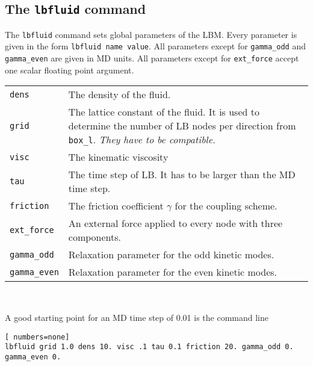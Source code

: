 \subsection*{The \lstinline|lbfluid| command}
The \lstinline{lbfluid} command sets global parameters of the LBM. Every
parameter is given in the form \lstinline|lbfluid name value|. 
All parameters except for \lstinline|gamma_odd| and  \lstinline|gamma_even|
are given in MD units. All parameters except for \lstinline|ext_force| accept
one scalar floating point argument. \\
\vspace{0,2cm}
\begin{tabular}{p{}p{}}
\lstinline|dens| & The density of the fluid.\\
\lstinline|grid| & The lattice constant of the fluid. It is used to determine the number of LB nodes 
per direction from \lstinline|box_l|. {\em They have to be compatible.} \\
\lstinline|visc| & The kinematic viscosity \\
\lstinline|tau| & The time step of LB. It has to be larger than the MD time step. \\
\lstinline|friction| & The friction coefficient $\gamma$ for the coupling scheme. \\
\lstinline|ext_force| & An external force applied to every node with three components. \\
\lstinline|gamma_odd| & Relaxation parameter for the odd kinetic modes. \\
\lstinline|gamma_even| & Relaxation parameter for the even kinetic modes.
\end{tabular} \\
\vspace{0,2cm}

A good starting point for an MD time step of 0.01 is the command line
\vspace{0,2cm}
\begin{lstlisting}[ numbers=none]
lbfluid grid 1.0 dens 10. visc .1 tau 0.1 friction 20. gamma_odd 0. gamma_even 0.
\end{lstlisting}
\vspace{0,2cm}



